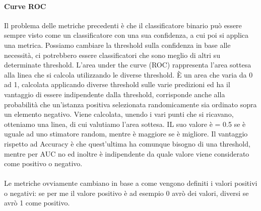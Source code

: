 \documentclass{article}
\begin{document}
\paragraph{Curve ROC}Il problema delle metriche precedenti è che il classificatore binario può essere sempre visto come un classificatore con una sua confidenza, a cui poi si applica una metrica. Possiamo cambiare la threshold sulla confidenza in base alle necessità, ci potrebbero essere classificatori che sono meglio di altri su determinate threshold. L'area under the curve (ROC) rappresenta l'area sottesa alla linea che si calcola utilizzando le diverse threshold. È un area che varia da 0 ad 1, calcolata applicando diverse threshold sulle varie predizioni ed ha il vantaggio di essere indipendente dalla threshold, corrisponde anche alla probabilità che un'istanza positiva selezionata randomicamente sia ordinato sopra un elemento negativo. Viene calcolata, unendo i vari punti che si ricavano, otteniamo una linea, di cui valutiamo l'area sottesa. IL suo valore è = 0.5 se è uguale ad uno stimatore random, mentre è maggiore se è migliore. Il vantaggio rispetto ad Accuracy è che quest'ultima ha comunque bisogno di una threshold, mentre per AUC no ed inoltre è indipendente da quale valore viene considerato come positivo o negativo.\\\\ Le metriche ovviamente cambiano in base a come vengono definiti i valori positivi o negativi: se per me il valore positivo è ad esempio 0 avrò dei valori, diversi se avrò 1 come positivo.
\end{document}
